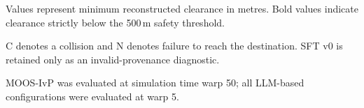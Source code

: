 \documentclass[10pt]{reportMaster}
\begin{document}
\begin{table}[t]
\begin{threeparttable}
{\begin{tabular}{@{}r r r r r r r r r r@{}}
\bottomrule
\end{tabular}%
}

\begin{tablenotes}[flushleft]
\footnotesize
\item Values represent minimum reconstructed clearance
in metres. Bold values indicate clearance strictly
below the 500\,m safety threshold.
\item C denotes a collision and N denotes failure
to reach the destination. SFT v0 is retained only
as an invalid-provenance diagnostic.
\item MOOS-IvP was evaluated at simulation time warp 50;
all LLM-based configurations were evaluated at warp 5.
\end{tablenotes}

\end{threeparttable}
\end{table}
\end{document}
